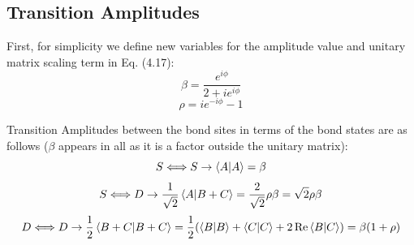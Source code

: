 \subsection{Transition Amplitudes}



First, for simplicity we define new variables for the amplitude value and unitary matrix scaling term in Eq. (4.17):
\begin{equation}
    \beta =  \frac{e^{i\phi}}{2+ie^{i\phi}}
\end{equation}
\begin{equation}
    \rho = ie^{-i\phi} - 1
\end{equation}

Transition Amplitudes between the bond sites in terms of the bond states are as follows ($\beta$ appears in all as it is a factor outside the unitary matrix): 
\begin{equation}
    S \Longleftrightarrow S \rightarrow \braket{A|A} = \beta
\end{equation}
\begin{equation}
    S \Longleftrightarrow D \rightarrow \frac{1}{\sqrt{2}} \braket{A|B+C} = \frac{2}{\sqrt{2}}\rho \beta = \sqrt{2} \rho \beta
\end{equation}
\begin{equation}
    D \Longleftrightarrow D \rightarrow \frac{1}{2} \braket{B+C|B+C} = \frac{1}{2} (\braket{B|B} + \braket{C|C} + 2\operatorname{Re}\braket{B|C}) = \beta (1 + \rho)
\end{equation}
\newpage
